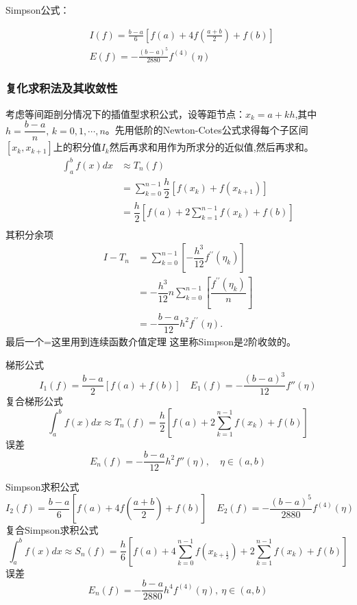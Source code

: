 \begin{note}
    Simpson公式：

    \[
        \begin{aligned}
            &I(f) = \frac{b-a}{6}\left[ f(a)+4f(\frac{a+b}{2})+f(b) \right] \\
            &E(f) = -\frac{(b-a)^5}{2880}f^{(4)}(\eta)
        \end{aligned} 
    \]
\end{note}
\subsubsection{复化求积法及其收敛性}
\begin{definition}[复化求积公式]
    考虑等间距剖分情况下的插值型求积公式，设等距节点：$x_k = a+kh$,其中$h = \dfrac{b-a}{n},\,k = 0,1,\cdots, n$。先用低阶的Newton-Cotes公式求得每个子区间$[x_k,x_{k+1}]$上的积分值$I_k$然后再求和用作为所求分的近似值,然后再求和。
    \[
        \begin{array}{ll}
            \int_a^bf(x)dx & \approx T_n(f)\\
            &= \sum\limits_{k=0}^{n-1}\dfrac{h}{2}[f(x_k)+f(x_{k+1})] \\
            &=\dfrac{h}{2}[f(a)+2\sum\limits_{k=1}^{n-1}f(x_k)+f(b)]\\
        \end{array}
    \]
    其积分余项
    \[
        \begin{array}{ll}
            I-T_n&=\sum\limits_{k=0}^{n-1}\left[-\dfrac{h^3}{12}f^{\prime\prime}(\eta_k)\right]\\
            &= -\dfrac{h^3}{12}n\sum\limits_{k=0}^{n-1}\left[\dfrac{f^{\prime\prime}(\eta_k)}{n}\right] \\
            &=-\dfrac{b-a}{12}h^2f^{\prime\prime}(\eta).
        \end{array}
    \]
    \colorbox{cyan!50}{最后一个=这里用到连续函数介值定理}
    \newline
    这里称Simpson是2阶收敛的。
\end{definition}
\begin{note}
    梯形公式
    \[
        I_1(f)=\dfrac{b-a}{2}[f(a)+f(b)]\quad E_1(f)=-\dfrac{(b-a)^3}{12}f''(\eta)
    \]
    复合梯形公式
    \[
        \int_a^bf(x)dx\approx T_n(f)=\dfrac{h}{2}[f(a)+2\sum_{k=1}^{n-1}f(x_k)+f(b)]
    \]
    误差
    \[
        E_n(f)=-\frac{b-a}{12}h^2f''(\eta),\quad\eta\in(a,b)
    \]
\end{note}
\begin{note}
    Simpson求积公式
    \[
        I_{2}(f)=\frac{b-a}{6}[f(a)+4f(\frac{a+b}{2})+f(b)]\quad E_{2}(f)=-\frac{(b-a)^{5}}{2880}f^{(4)}(\eta)
    \]
    复合Simpson求积公式
    \[
        \int_{a}^{b}f(x)dx\approx S_{n}(f)=\frac{h}{6}[f(a)+4\sum_{k=0}^{n-1}f(x_{k+\frac{1}{2}})+2\sum_{k=1}^{n-1}f(x_{k})+f(b)]
    \]
    误差
    \[
        E_n(f)=-\dfrac{b-a}{2880}h^4f^{(4)}(\eta),\:\eta\in(a,b)
    \]
\end{note}
